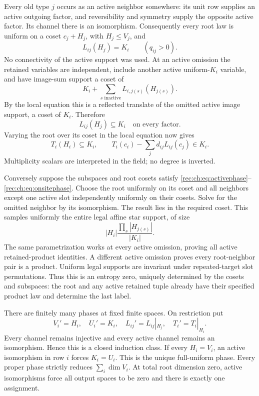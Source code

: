 \documentclass[11pt]{article}
\theoremstyle{definition}
\theoremstyle{remark}
\newcommand{\1}{\mathbf 1}
\begin{document}
Every old type $j$ occurs as an active neighbor somewhere: its unit row supplies an active outgoing factor, and reversibility and symmetry supply the opposite active factor. Its channel there is an isomorphism. Consequently every root law is uniform on a coset $c_j+H_j$, with $H_j\le V_j$, and
\begin{equation}\label{rec:ch:eq:activephase}
 L_{ij}(H_j)=K_i\qquad(q_{ij}>0).
\end{equation}
No connectivity of the active support was used. At an active omission the retained variables are independent, include another active uniform-$K_i$ variable, and have image-sum support a coset of
\[
 K_i+\sum_{s\text{ inactive}}L_{i,j(s)}(H_{j(s)}).
\]
By the local equation this is a reflected translate of the omitted active image support, a coset of $K_i$. Therefore
\begin{equation}\label{rec:ch:eq:inactivephase}
 L_{ij}(H_j)\subseteq K_i\quad\text{on every factor}.
\end{equation}
Varying the root over its coset in the local equation now gives
\begin{equation}\label{rec:ch:eq:onsitephase}
 T_i(H_i)\subseteq K_i,\qquad
 T_i(c_i)-\sum_jd_{ij}L_{ij}(c_j)\in K_i.
\end{equation}
Multiplicity scalars are interpreted in the field; no degree is inverted.

Conversely suppose the subspaces and root cosets satisfy \eqref{rec:ch:eq:activephase}--\eqref{rec:ch:eq:onsitephase}. Choose the root uniformly on its coset and all neighbors except one active slot independently uniformly on their cosets. Solve for the omitted neighbor by its isomorphism. The result lies in the required coset. This samples uniformly the entire legal affine star support, of size
\[
 |H_i|\frac{\prod_s|H_{j(s)}|}{|K_i|}.
\]
The same parametrization works at every active omission, proving all active retained-product identities. A different active omission proves every root-neighbor pair is a product. Uniform legal supports are invariant under repeated-target slot permutations. Thus this is an entropy zero, uniquely determined by the cosets and subspaces: the root and any active retained tuple already have their specified product law and determine the last label.

There are finitely many phases at fixed finite spaces. On restriction put
\begin{equation}\label{rec:ch:eq:restriction}
 V_i'=H_i,\quad U_i'=K_i,\quad L_{ij}'=L_{ij}|_{H_j},\quad T_i'=T_i|_{H_i}.
\end{equation}
Every channel remains injective and every active channel remains an isomorphism. Hence this is a closed induction class. If every $H_i=V_i$, an active isomorphism in row $i$ forces $K_i=U_i$. This is the unique full-uniform phase. Every proper phase strictly reduces $\sum_i\dim V_i$. At total root dimension zero, active isomorphisms force all output spaces to be zero and there is exactly one assignment.
\end{document}
